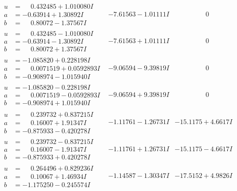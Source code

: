 \documentclass[1p]{elsarticle_modified}
\theoremstyle{definition}
\begin{document}
$$\begin{array}{c|c|c}
\begin{aligned}
u &= \phantom{-}0.432485 + 1.010080 I \\
a &= -0.63914 + 1.30892 I \\
b &= \phantom{-}0.80072 - 1.37567 I\end{aligned}
 & -7.61563 - 1.01111 I & \phantom{-0.000000 } 0 \\ \hline\begin{aligned}
u &= \phantom{-}0.432485 - 1.010080 I \\
a &= -0.63914 - 1.30892 I \\
b &= \phantom{-}0.80072 + 1.37567 I\end{aligned}
 & -7.61563 + 1.01111 I & \phantom{-0.000000 } 0 \\ \hline\begin{aligned}
u &= -1.085820 + 0.228198 I \\
a &= \phantom{-}0.0071519 + 0.0592893 I \\
b &= -0.908974 - 1.015940 I\end{aligned}
 & -9.06594 - 9.39819 I & \phantom{-0.000000 } 0 \\ \hline\begin{aligned}
u &= -1.085820 - 0.228198 I \\
a &= \phantom{-}0.0071519 - 0.0592893 I \\
b &= -0.908974 + 1.015940 I\end{aligned}
 & -9.06594 + 9.39819 I & \phantom{-0.000000 } 0 \\ \hline\begin{aligned}
u &= \phantom{-}0.239732 + 0.837215 I \\
a &= \phantom{-}0.16007 + 1.91347 I \\
b &= -0.875933 - 0.420278 I\end{aligned}
 & -1.11761 - 1.26731 I & -15.1175 + 4.6617 I \\ \hline\begin{aligned}
u &= \phantom{-}0.239732 - 0.837215 I \\
a &= \phantom{-}0.16007 - 1.91347 I \\
b &= -0.875933 + 0.420278 I\end{aligned}
 & -1.11761 + 1.26731 I & -15.1175 - 4.6617 I \\ \hline\begin{aligned}
u &= \phantom{-}0.264496 + 0.829236 I \\
a &= \phantom{-}0.10067 + 1.46934 I \\
b &= -1.175250 - 0.245574 I\end{aligned}
 & -1.14587 - 1.30347 I & -17.5152 + 4.9826 I \\ \hline\begin{aligned}

\end{aligned}
\end{array}$$
\end{document}

